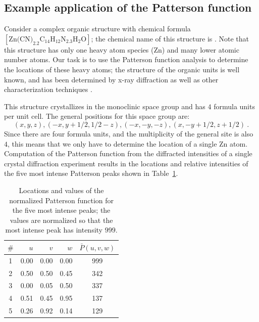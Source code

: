 \subsection{Example application of the Patterson function}\label{\chabbr:ssec:Patexample}
Consider a complex organic structure with chemical formula $[\text{Zn(CN)}_2.2\text{C}_{14}\text{H}_{12}\text{N}_2.3\text{H}_2\text{O}]$; the chemical name of this structure is . Note that this structure has only one heavy atom species (Zn) and many lower atomic number atoms.  Our task is to use the Patterson function analysis to determine the locations of these heavy atoms; the structure of the organic units is well known, and has been determined by x-ray diffraction as well as other characterization techniques \cite{monge1978a}. 

This structure crystallizes in the monoclinic space group  and has $4$ formula units per unit cell.  The general positions for this space group are:
\[
	(x,y,z), (-x,y+1/2,1/2-z), (-x,-y,-z), (x,-y+1/2,z+1/2)\ .
\]
Since there are four formula units, and the multiplicity of the general site is also $4$, this means that we only have to determine the location of a single Zn atom.  Computation of the Patterson function from the diffracted intensities of a single crystal diffraction experiment results in the locations and relative intensities of the five most intense Patterson peaks shown in Table~\ref{\chabbr:tb:ZnPat}. 

\begin{table}[h!]
\centering\leavevmode
\begin{tabular}{|crrr|c|}
\hline
$\#$ & $u$ & $v$ & $w$ & $\bar{P}(u,v,w)$\\
\hline\hline
1&0.00&0.00&0.00&999\\
2&0.50&0.50&0.45&342\\
3&0.00&0.05&0.50&337\\
4&0.51&0.45&0.95&137\\
5&0.26&0.92&0.14&129\\
\hline
\end{tabular}
\caption{\label{\chabbr:tb:ZnPat}Locations and values of the normalized Patterson function for the five most intense peaks; the values are normalized so that the most intense peak has intensity $999$.}
\end{table}

